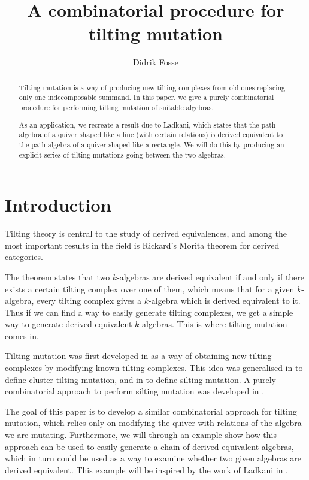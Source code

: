 \documentclass[12pt, dvipsnames, oneside]{amsart}
\title{A combinatorial procedure for tilting mutation}
\author{Didrik Fosse}
\theoremstyle{definition}
\begin{document}
\begin{abstract}
Tilting mutation is a way of producing new tilting complexes from old ones replacing only one indecomposable summand. In this paper, we give a purely combinatorial procedure for performing tilting mutation of suitable algebras.

As an application, we recreate a result due to Ladkani, which states that the path algebra of a quiver shaped like a line (with certain relations) is derived equivalent to the path algebra of a quiver shaped like a rectangle. We will do this by producing an explicit series of tilting mutations going between the two algebras.
\end{abstract}

\maketitle

\section{Introduction}
Tilting theory is central to the study of derived equivalences, and among the most important results in the field is Rickard's Morita theorem for derived categories.\cite{Rickard1989} 

The theorem states that two $k$-algebras are derived equivalent if and only if there exists a certain tilting complex over one of them, which means that for a given $k$-algebra, every tilting complex gives a $k$-algebra which is derived equivalent to it. Thus if we can find a way to easily generate tilting complexes, we get a simple way to generate derived equivalent $k$-algebras. This is where tilting mutation comes in.

Tilting mutation was first developed in \cite{RS1991} as a way of obtaining new tilting complexes by modifying known tilting complexes. This idea was generalised in \cite{BMRRT2004} to define cluster tilting mutation, and in \cite{AI2012} to define silting mutation. 
A purely combinatorial approach to perform silting mutation was developed in \cite{Oppermann2015}. 

\medskip

The goal of this paper is to develop a similar combinatorial approach for tilting mutation, which relies only on modifying the quiver with relations of the algebra we are mutating. Furthermore, we will through an example show how this approach can be used to easily generate a chain of derived equivalent algebras, which in turn could be used as a way to examine whether two given algebras are derived equivalent. This example will be inspired by the work of Ladkani in \cite{Ladkani2013}.
\end{document}
